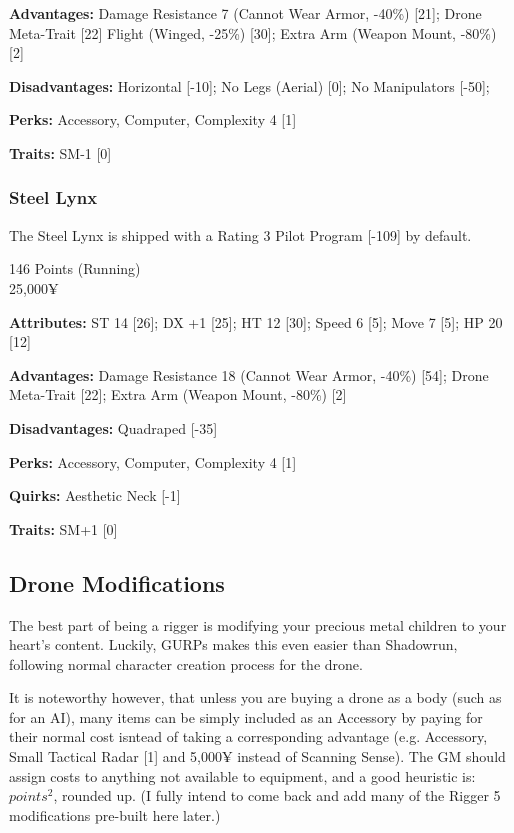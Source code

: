 \begin{multicols*}{2}
	\textbf{Advantages:} 
	Damage Resistance 7 (Cannot Wear Armor, -40\%) [21]; Drone Meta-Trait [22] Flight (Winged, -25\%) [30]; Extra Arm (Weapon Mount, -80\%) [2]
	
	\textbf{Disadvantages:} 
	Horizontal [-10]; No Legs (Aerial) [0]; No Manipulators [-50]; 
	
	\textbf{Perks:}
	Accessory, Computer, Complexity 4 [1]
	
	\textbf{Traits:}
	SM-1 [0]
	
	\subsubsection{Steel Lynx}
	
	The Steel Lynx is shipped with a Rating 3 Pilot Program [-109] by default.
	
	\begin{flushright}
		146 Points (Running)\\
		25,000¥
	\end{flushright}
	
	\textbf{Attributes:} 
	ST 14 [26]; DX +1 [25]; HT 12 [30]; 
	Speed 6 [5]; Move 7 [5]; HP 20 [12]
	
	\textbf{Advantages:} 
	Damage Resistance 18 (Cannot Wear Armor, -40\%) [54]; Drone Meta-Trait [22]; Extra Arm (Weapon Mount, -80\%) [2]
	
	\textbf{Disadvantages:} 
	Quadraped [-35]
	
	\textbf{Perks:}
	Accessory, Computer, Complexity 4 [1]
	
	\textbf{Quirks:}
	Aesthetic Neck [-1]
	
	\textbf{Traits:}
	SM+1 [0]
	
	\subsection{Drone Modifications}
	
	The best part of being a rigger is modifying your precious metal children to your heart's content. Luckily, GURPs makes this even easier than Shadowrun, following normal character creation process for the drone. 
	
	It is noteworthy however, that unless you are buying a drone as a body (such as for an AI), many items can be simply included as an Accessory by paying for their normal cost isntead of taking a corresponding advantage (e.g. Accessory, Small Tactical Radar [1] and 5,000¥ instead of Scanning Sense). The GM should assign costs to anything not available to equipment, and a good heuristic is: $points^{2}$, rounded up. (I fully intend to come back and add many of the Rigger 5 modifications pre-built here later.)
	

\end{multicols*}
